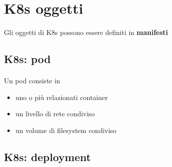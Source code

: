 \documentclass[a4paper, 12pt]{report}
\begin{document}
          \section{K8s oggetti}
          \paragraph{}Gli oggetti di K8s possono essere definiti in \textbf{manifesti}
          \subsection{K8s: pod}
          \paragraph{}Un pod consiste in 
            \begin{itemize}
              \item uno o più relazionati container
              \item un livello di rete condiviso
              \item un volume di filesystem condiviso
            \end{itemize}
          \subsection{K8s: deployment}
          \paragraph{} 
\end{document}
